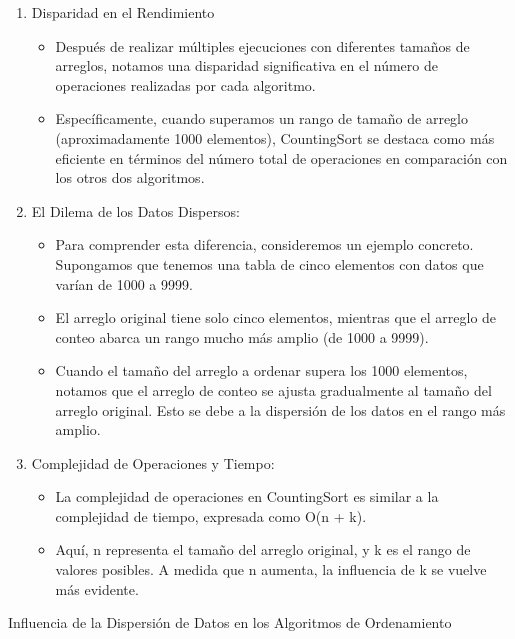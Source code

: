 \documentclass[12pt]{article}
\begin{document}
\begin{enumerate}
    \item Disparidad en el Rendimiento
          \begin{itemize}
              \item Después de realizar múltiples ejecuciones con diferentes tamaños de arreglos, notamos una disparidad significativa en el número de operaciones realizadas por cada algoritmo.
              \item Específicamente, cuando superamos un rango de tamaño de arreglo (aproximadamente 1000 elementos), CountingSort se destaca como más eficiente en términos del número total de operaciones en comparación con los otros dos algoritmos.
          \end{itemize}
    \item El Dilema de los Datos Dispersos:
          \begin{itemize}
              \item Para comprender esta diferencia, consideremos un ejemplo concreto. Supongamos que tenemos una tabla de cinco elementos con datos que varían de 1000 a 9999.
              \item El arreglo original tiene solo cinco elementos, mientras que el arreglo de conteo abarca un rango mucho más amplio (de 1000 a 9999).
              \item Cuando el tamaño del arreglo a ordenar supera los 1000 elementos, notamos que el arreglo de conteo se ajusta gradualmente al tamaño del arreglo original. Esto se debe a la dispersión de los datos en el rango más amplio.
          \end{itemize}
    \item Complejidad de Operaciones y Tiempo:
          \begin{itemize}
              \item La complejidad de operaciones en CountingSort es similar a la complejidad de tiempo, expresada como O(n + k).
              \item Aquí, n representa el tamaño del arreglo original, y k es el rango de valores posibles. A medida que n aumenta, la influencia de k se vuelve más evidente.
          \end{itemize}
\end{enumerate}
\par\vspace{0.4cm}
Influencia de la Dispersión de Datos en los Algoritmos de Ordenamiento
\par\vspace{0.4cm}
\end{document}

